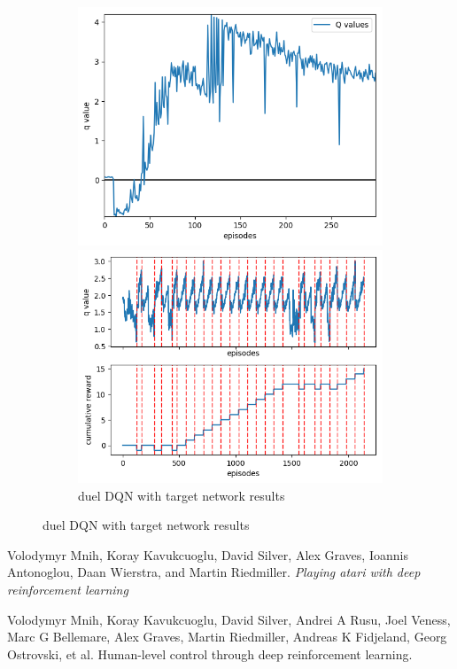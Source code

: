 \documentclass[10pt]{article}
\begin{document}
\begin{figure}
\begin{subfigure}{0.49\textwidth}
\begin{minipage}{\linewidth}
			\includegraphics[width=\linewidth]{duel_DDQN_qval.png}
		\end{minipage}\vfill
		\begin{minipage}{\linewidth}
			\includegraphics[width=\linewidth]{duel_DDQN_game.png}
		\end{minipage}	\vfill
		\caption{duel DQN with target network results}
	\end{subfigure}
	\setcounter{figure}{2}    
\end{figure}
\FloatBarrier
\begin{thebibliography}{9}
	
	 Volodymyr Mnih, Koray Kavukcuoglu, David Silver, Alex Graves,
	 Ioannis Antonoglou, Daan Wierstra, and Martin Riedmiller. \textit{Playing
	 atari with deep reinforcement learning}
	
	Volodymyr Mnih, Koray Kavukcuoglu, David Silver, Andrei A Rusu,
	Joel Veness, Marc G Bellemare, Alex Graves, Martin Riedmiller, Andreas
	K Fidjeland, Georg Ostrovski, et al. Human-level control through
	deep reinforcement learning.
	
\end{thebibliography}
\end{document}
